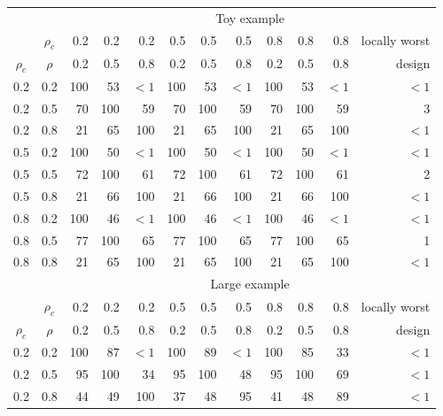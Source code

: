 \documentclass[12pt]{article}
\begin{document}
{\footnotesize
\vspace{.05in}
\begin{center}
\begin{tabular}{|cc|rrrrrrrrrr|}
\hline
&& \multicolumn{10}{c|}{Toy example}  \\
           & $\rho_{c}$ &  0.2 & 0.2 & 0.2 & 0.5 & 0.5 & 0.5 & 0.8 & 0.8 & 0.8 & locally worst \\
$\rho_{c}$ & $\rho$     &  0.2 & 0.5 & 0.8 & 0.2 & 0.5 & 0.8 & 0.2 & 0.5 & 0.8 & design \\
\hline
0.2 & 0.2 & 100 & 53  & $<1$  & 100 & 53  & $<1$& 100 & 53  & $<1$  & $<1$\\
0.2 & 0.5 & 70  & 100 & 59    & 70  & 100 & 59  & 70  & 100 & 59    & 3   \\
0.2 & 0.8 & 21  & 65  & 100   & 21  & 65  & 100 & 21  & 65  & 100   & $<1$\\
0.5 & 0.2 & 100 & 50  & $<1$  & 100 & 50  & $<1$& 100 & 50  & $<1$  & $<1$\\
0.5 & 0.5 & 72  & 100 & 61    & 72  & 100 & 61  & 72  & 100 & 61    & 2   \\
0.5 & 0.8 & 21  & 66  & 100   & 21  & 66  & 100 & 21  & 66  & 100   & $<1$\\
0.8 & 0.2 & 100 & 46  & $<1$  & 100 & 46  & $<1$& 100 & 46  & $<1$  & $<1$\\
0.8 & 0.5 & 77  & 100 & 65    & 77  & 100 & 65  & 77  & 100 & 65    & 1\\
0.8 & 0.8 & 21  & 65  & 100   & 21  & 65  & 100 & 21  & 65  & 100   & $<1$\\
\hline
&& \multicolumn{10}{c|}{Large example} \\
           & $\rho_{c}$ &  0.2 & 0.2 & 0.2 & 0.5 & 0.5 & 0.5 & 0.8 & 0.8 & 0.8 & locally worst \\
$\rho_{c}$ & $\rho$     &  0.2 & 0.5 & 0.8 & 0.2 & 0.5 & 0.8 & 0.2 & 0.5 & 0.8 & design \\
\hline
0.2 & 0.2 & 100 & 87 & $<1$ & 100 & 89 & $<1$ & 100 & 85 & 33     & $<1$ \\
0.2 & 0.5 & 95 & 100 & 34 & 95 & 100 & 48 & 95 & 100 & 69         & $<1$ \\
0.2 & 0.8 & 44 & 49 & 100 & 37 & 48 & 95 & 41 & 48 & 89           & $<1$ \\

\end{tabular}
\end{center}}
\end{document}

